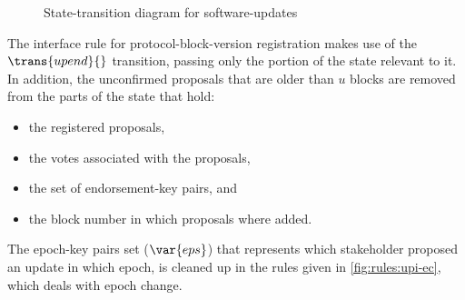 \begin{figure}[ht]
  \centering

  \caption{State-transition diagram for software-updates}
  \label{fig:st-diagram-sw-up}
\end{figure}

\clearpage

The interface rule for protocol-block-version registration makes use of the
$\trans{upend}{}$ transition, passing only the portion of the state relevant
to it. In addition, the unconfirmed proposals that are older than $u$ blocks
are removed from the parts of the state that hold:
\begin{itemize}
\item the registered proposals,
\item the votes associated with the proposals,
\item the set of endorsement-key pairs, and
\item the block number in which proposals where added.
\end{itemize}
The epoch-key pairs set ($\var{eps}$) that represents which stakeholder
proposed an update in which epoch, is cleaned up in the rules given in
\cref{fig:rules:upi-ec}, which deals with epoch change.

